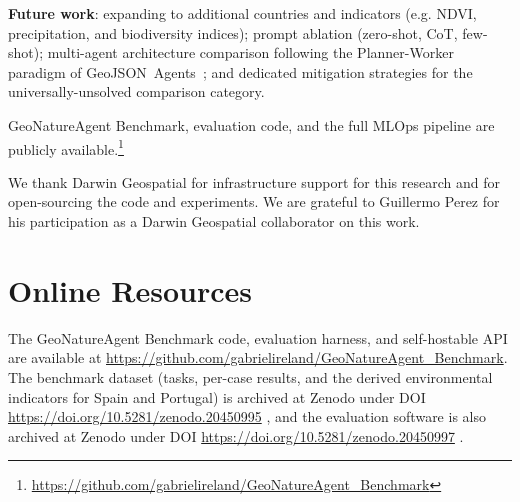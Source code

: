 \documentclass[sigconf]{acmart}
\begin{document}
\noindent\textbf{Future work}: expanding to additional countries and indicators (e.g. NDVI, precipitation, and biodiversity indices); prompt ablation (zero-shot, CoT, few-shot); multi-agent architecture comparison following the Planner-Worker paradigm of GeoJSON~Agents~\citep{luo2025geojsonagents}; and dedicated mitigation strategies for the universally-unsolved comparison category.

GeoNatureAgent Benchmark, evaluation code, and the full MLOps pipeline are publicly available.\footnote{\url{https://github.com/gabrielireland/GeoNatureAgent_Benchmark}}


\begin{acks}
We thank Darwin Geospatial for infrastructure support for this research and for open-sourcing the code and experiments. We are grateful to Guillermo Perez for his participation as a Darwin Geospatial collaborator on this work.
\end{acks}





\appendix


\section{Online Resources}
\label{sec:Data_Availability}

The GeoNatureAgent Benchmark code, evaluation harness, and self-hostable API are available at \url{https://github.com/gabrielireland/GeoNatureAgent_Benchmark}. The benchmark dataset (tasks, per-case results, and the derived environmental indicators for Spain and Portugal) is archived at Zenodo under DOI \url{https://doi.org/10.5281/zenodo.20450995} \citep{geonatureagent_dataset}, and the evaluation software is also archived at Zenodo under DOI \url{https://doi.org/10.5281/zenodo.20450997} \citep{geonatureagent_software}.
\end{document}
